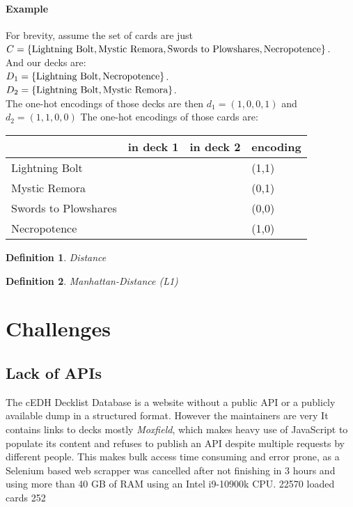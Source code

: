 \documentclass[a4]{article}
\newcommand{\cmark}{\ding{51}}
\newtheorem{definition}{Definition}
\begin{document}
\paragraph{Example}
For brevity, assume the set of cards are just\\
$C = \{\textnormal{Lightning Bolt}, \textnormal{Mystic Remora}, \textnormal{Swords to Plowshares}, \textnormal{Necropotence}\}$.\\
And our decks are:\\
$D_1 = \{\textnormal{Lightning Bolt}, \textnormal{Necropotence}\}$.\\
$D_2 = \{\textnormal{Lightning Bolt}, \textnormal{Mystic Remora}\}$.\\
The one-hot encodings of those decks are then $d_1 = (1,0,0,1) $ and $d_2 = (1,1,0,0)$
The one-hot encodings of those cards are:\\
\begin{tabular}{llll}
\toprule
			&in deck 1	&in deck 2	&encoding\\
\midrule
Lightning Bolt		&\cmark		&\cmark		&(1,1)\\
Mystic Remora		&		&		&(0,1)\\
Swords to Plowshares	&		&		&(0,0)\\
Necropotence		&		&		&(1,0)\\
\bottomrule
\end{tabular}

\begin{definition}{Distance}

\end{definition}

\begin{definition}{Manhattan-Distance (L1)}
\end{definition}

\section{Challenges}
\subsection{Lack of APIs}
The cEDH Decklist Database is a website without a public API or a publicly available dump in a structured format.
However the maintainers are very 
It contains links to decks mostly \emph{Moxfield}, which makes heavy use of JavaScript to populate its content and refuses to publish an API despite multiple requests by different people.
This makes bulk access time consuming and error prone, as a Selenium based web scrapper was cancelled after not finishing in 3 hours and using more than 40 GB of RAM using an Intel i9-10900k CPU.\footnotemark{}
22570 loaded cards
252
\end{document}
